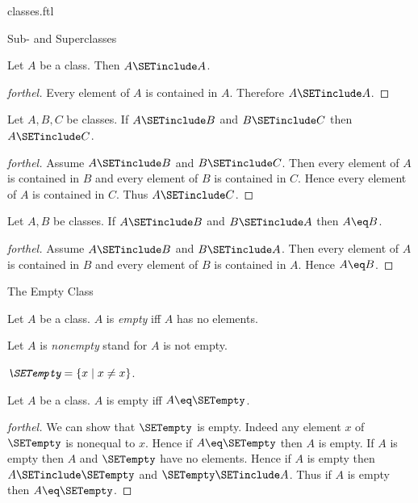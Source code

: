 \documentclass{naproche-library}
\begin{document}
\begin{smodule}[title=Classes]{classes.ftl}
\begin{sfragment}{Sub- and Superclasses}
  \begin{proposition}[forthel,id=FOUNDATIONS_01_5994555614691328]
    Let $A$ be a class.
    Then $A \SETinclude A$.
  \end{proposition}
  \begin{proof}[forthel]
    Every element of $A$ is contained in $A$.
    Therefore $A \SETinclude A$.
  \end{proof}

  \begin{proposition}[forthel,id=FOUNDATIONS_01_3939677545431040]
    Let $A, B, C$ be classes.
    If $A \SETinclude B$ and $B \SETinclude C$ then $A \SETinclude C$.
  \end{proposition}
  \begin{proof}[forthel]
    Assume $A \SETinclude B$ and $B \SETinclude C$.
    Then every element of $A$ is contained in $B$ and every element of $B$ is contained in $C$.
    Hence every element of $A$ is contained in $C$.
    Thus $A \SETinclude C$.
  \end{proof}

  \begin{proposition}[forthel,id=FOUNDATIONS_01_7159957847801856]
    Let $A, B$ be classes.
    If $A \SETinclude B$ and $B \SETinclude A$ then $A \eq B$.
  \end{proposition}
  \begin{proof}[forthel]
    Assume $A \SETinclude B$ and $B \SETinclude A$.
    Then every element of $A$ is contained in $B$ and every element of $B$ is contained in $A$.
    Hence $A \eq B$.
  \end{proof}
\end{sfragment}

\begin{sfragment}{The Empty Class}
  \begin{definition}[forthel,id=FOUNDATIONS_01_6252477624090624]
    Let $A$ be a class.
    $A$ is \emph{empty} iff $A$ has no elements.

    Let $A$ is \emph{nonempty} stand for $A$ is not empty.
  \end{definition}

  \begin{definition}[forthel,id=FOUNDATIONS_01_7939928493129728]
    $\emph{\SETempty} = \{ x \mid x \neq x \}$.
  \end{definition}

  \begin{proposition}[forthel,id=FOUNDATIONS_01_2263153161273344]
    Let $A$ be a class.
    $A$ is empty iff $A \eq \SETempty$.
  \end{proposition}
  \begin{proof}[forthel]
    We can show that $\SETempty$ is empty.
    Indeed any element $x$ of $\SETempty$ is nonequal to $x$.
    Hence if $A \eq \SETempty$ then $A$ is empty.
    If $A$ is empty then $A$ and $\SETempty$ have no elements.
    Hence if $A$ is empty then $A \SETinclude \SETempty$ and $\SETempty \SETinclude A$.
    Thus if $A$ is empty then $A \eq \SETempty$.
  \end{proof}


\end{sfragment}
\end{smodule}
\end{document}
